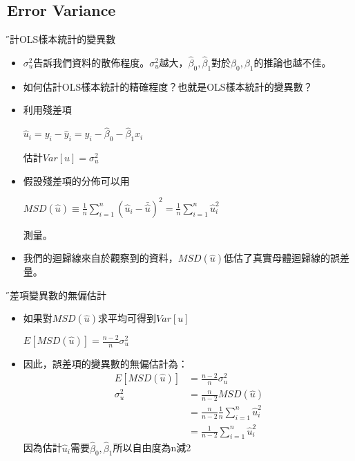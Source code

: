 \documentclass[xcolor=dvipsnames]{beamer}
\begin{document}
\subsection{Error Variance}
\begin{frame}{\H 估計OLS樣本統計的變異數}
\begin{itemize}
\item $\sigma_{u}^2$告訴我們資料的散佈程度。$\sigma_{u}^2$越大，$\hat{\beta}_{0},\hat{\beta}_{1}$對於$\beta_{0},\beta_{1}$的推論也越不佳。
\item 如何估計OLS樣本統計的精確程度？也就是OLS樣本統計的變異數？
\item 利用殘差項
\begin{center} $\hat{u}_{i}=y_{i}-\hat{y}_{i}=y_{i}-\hat{\beta}_{0}-\hat{\beta}_{1}x_{i} $
\end{center}
估計$ Var[u]=\sigma^{2}_{u} $
\item 假設殘差項的分佈可以用
\begin{center}
$ MSD(\hat{u})\equiv\frac{1}{n}\sum\limits_{i=1}^{n}(\hat{u}_{i}-\bar{\hat{u}})^2=\frac{1}{n}\sum\limits_{i=1}^{n}\hat{u}_{i}^2 $
\end{center}
測量。
\item 我們的迴歸線來自於觀察到的資料，$ MSD(\hat{u}) $低估了真實母體迴歸線的誤差量。

\end{itemize}
\end{frame}
\begin{frame}{\H 誤差項變異數的無偏估計}
\begin{itemize}
\item 如果對$ MSD(\hat{u}) $求平均可得到$Var[u] $
\begin{center}
$ E[MSD(\hat{u})]=\frac{n-2}{n}\sigma^{2}_{u} $
\end{center}
\item 因此，誤差項的變異數的無偏估計為：
\begin{align*}
E[MSD(\hat{u})] & =\frac{n-2}{n}\sigma^{2}_{u} \\
\sigma^{2}_{u} & =\frac{n}{n-2}MSD(\hat{u})\\
  & = \frac{n}{n-2}\frac{1}{n}\sum\limits_{i=1}^{n}\hat{u}_{i}^2\\
  & = \frac{1}{n-2}\sum\limits_{i=1}^{n}\hat{u}_{i}^2
\end{align*}
因為估計$\hat{u}_{i}$需要$ \hat{\beta}_{0},\hat{\beta}_{1} $所以自由度為n減2
\end{itemize}
\end{frame}
\end{document}
